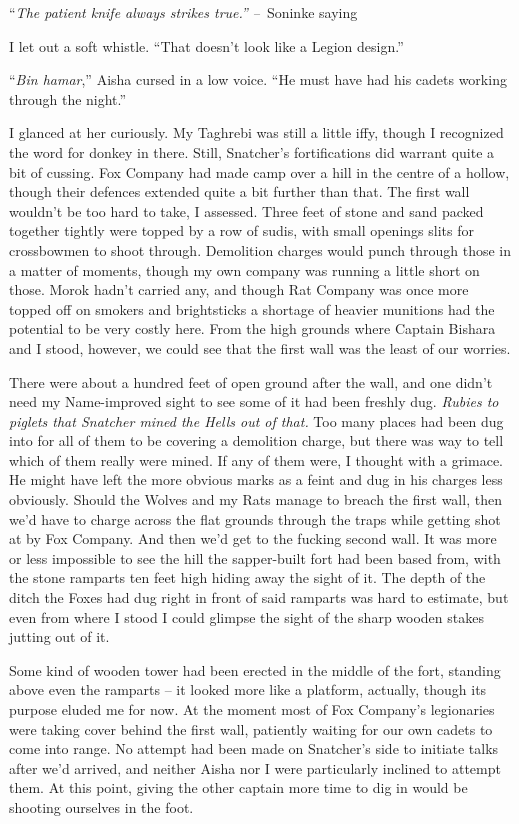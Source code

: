 \documentclass[12pt, openany]{book}
\begin{document}
“\textit{The patient knife always strikes true.”}
\textit{– }Soninke saying

I let out a soft whistle. “That doesn’t look like a Legion design.”

“\textit{Bin hamar},” Aisha cursed in a low voice. “He must have had his cadets working through the night.”

I glanced at her curiously. My Taghrebi was still a little iffy, though I recognized the word for donkey in there. Still, Snatcher’s fortifications did warrant quite a bit of cussing. Fox Company had made camp over a hill in the centre of a hollow, though their defences extended quite a bit further than that. The first wall wouldn’t be too hard to take, I assessed. Three feet of stone and sand packed together tightly were topped by a row of sudis, with small openings slits for crossbowmen to shoot through. Demolition charges would punch through those in a matter of moments, though my own company was running a little short on those. Morok hadn’t carried any, and though Rat Company was once more topped off on smokers and brightsticks a shortage of heavier munitions had the potential to be very costly here. From the high grounds where Captain Bishara and I stood, however, we could see that the first wall was the least of our worries.

There were about a hundred feet of open ground after the wall, and one didn’t need my Name-improved sight to see some of it had been freshly dug. \textit{Rubies to piglets that Snatcher mined the Hells out of that.} Too many places had been dug into for all of them to be covering a demolition charge, but there was way to tell which of them really were mined. If any of them were, I thought with a grimace. He might have left the more obvious marks as a feint and dug in his charges less obviously. Should the Wolves and my Rats manage to breach the first wall, then we’d have to charge across the flat grounds through the traps while getting shot at by Fox Company. And then we’d get to the fucking second wall. It was more or less impossible to see the hill the sapper-built fort had been based from, with the stone ramparts ten feet high hiding away the sight of it. The depth of the ditch the Foxes had dug right in front of said ramparts was hard to estimate, but even from where I stood I could glimpse the sight of the sharp wooden stakes jutting out of it.

Some kind of wooden tower had been erected in the middle of the fort, standing above even the ramparts – it looked more like a platform, actually, though its purpose eluded me for now. At the moment most of Fox Company’s legionaries were taking cover behind the first wall, patiently waiting for our own cadets to come into range. No attempt had been made on Snatcher’s side to initiate talks after we’d arrived, and neither Aisha nor I were particularly inclined to attempt them. At this point, giving the other captain more time to dig in would be shooting ourselves in the foot.
\end{document}

